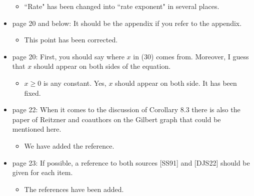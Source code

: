\documentclass[11pt]{article}
\begin{document}
\begin{itemize}
  \begin{itemize}
  \item ``Rate" has been changed into ``rate exponent" in several places. 
  \end{itemize}
  \item  page 20 and below: It should be the appendix if you refer to the appendix.
  \begin{itemize}
    \item This point has been corrected.
  \end{itemize}
  \item  page 20: First, you should say where $x$ in (30) comes from. Moreover, I guess that $x$ should appear on both sides of the equation.
  \begin{itemize}
    \item $x\ge0$ is any constant. Yes, $x$ should appear on both side. It has been fixed. 
  \end{itemize}
  \item  page 22: When it comes to the discussion of Corollary 8.3 there is also the paper of Reitzner and coauthors on the Gilbert graph that could be mentioned here.
  \begin{itemize}
    \item We have added the reference. 
  \end{itemize}
  \item  page 23: If possible, a reference to both sources [SS91] and [DJS22] should be given for each item.
  \begin{itemize}
    \item The references have been added. 
  \end{itemize}
\end{itemize}
\end{document}
